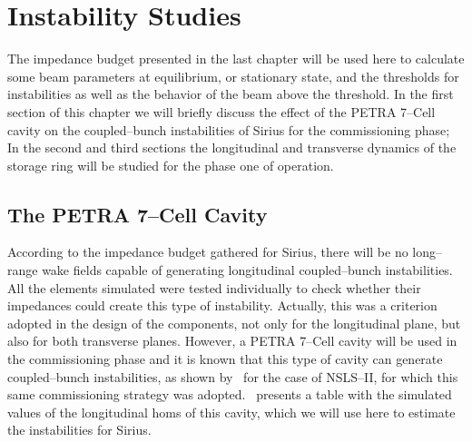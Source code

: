 \chapter{Instability Studies}\label{cap:instability_studies}

    The impedance budget presented in the last chapter will be used here to calculate some beam parameters at equilibrium, or stationary state, and the thresholds for instabilities as well as the behavior of the beam above the threshold. In the first section of this chapter we will briefly discuss the effect of the PETRA 7--Cell cavity on the coupled--bunch instabilities of Sirius for the commissioning phase; In the second and third sections the longitudinal and transverse dynamics of the storage ring will be studied for the phase one of operation.

\section{The PETRA 7--Cell Cavity}

    According to the impedance budget gathered for Sirius, there will be no long--range wake fields capable of generating longitudinal coupled--bunch instabilities. All the elements simulated were tested individually to check whether their impedances could create this type of instability. Actually, this was a criterion adopted in the design of the components, not only for the longitudinal plane, but also for both transverse planes. However, a PETRA 7--Cell cavity will be used in the commissioning phase and it is known that this type of cavity can generate coupled--bunch instabilities, as shown by~ for the case of NSLS--II, for which this same commissioning strategy was adopted.~ presents a table with the simulated values of the longitudinal \glspl{hom} of this cavity, which we will use here to estimate the instabilities for Sirius.

